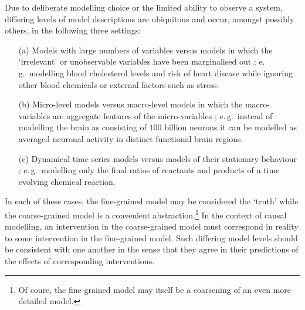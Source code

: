 Due to deliberate modelling choice or the limited ability to observe a system, differing levels of model descriptions are ubiquitous and occur, amongst possibly others, in the following three settings:

\begin{itemize}
	\item[(a)] Models with large numbers of variables versus models in which the `irrelevant' or unobservable variables have been marginalised out \citep{bongers2016structural}; e.\,g.\ modelling blood cholesterol levels and risk of heart disease while ignoring other blood chemicals or external factors such as stress.
	
	\item[(b)] Micro-level models versus macro-level models in which the macro-variables are aggregate features of the micro-variables \citep{simon1961aggregation,iwasaki1994causality,hoel2013quantifying,chalupka2015visual,chalupka2016multi}; e.\,g.\ instead of modelling the brain as consisting of $100$ billion neurons it can be modelled as averaged neuronal activity in distinct functional brain regions.
	
	\item[(c)] Dynamical time series models versus models of their stationary behaviour \citep{fisher1970correspondence,iwasaki1994causality,dash2001caveats,lacerda2012discovering,mooij2013ode,mooij2013cyclic}; e.\,g.\ modelling only the final ratios of reactants and products of a time evolving chemical reaction.
\end{itemize}

In each of these cases, the fine-grained model may be considered the `truth' while the coarse-grained model is a convenient abstraction.\footnote{Of coure, the fine-grained model may itself be a coarsening of an even more detailed model.} 
In the context of causal modelling, an intervention in the coarse-grained model must correspond in reality to some intervention in the fine-grained model.
Such differing model levels should be consistent with one another in the sense that they agree in their predictions of the effects of corresponding interventions. 


